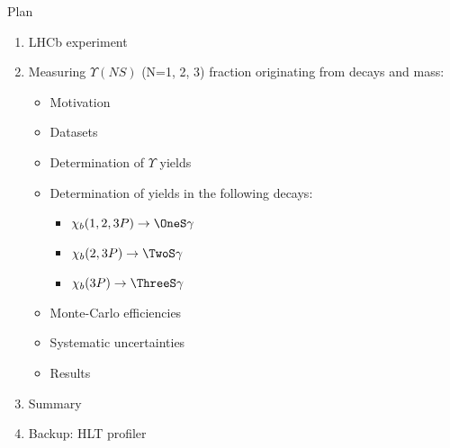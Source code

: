 \begin{frame}{Plan}
\begin{enumerate}
\item LHCb experiment
\item Measuring $\Upsilon(NS)$ (N=1, 2, 3) fraction  originating from \chib decays and \chibThreeP mass:
\begin{itemize}
\item Motivation
\item Datasets
\item Determination of $\Upsilon$ yields
\item Determination of \chib yields in the following decays:
\begin{itemize}
    \item $\chi_b(1,2,3P) \to \OneS \gamma$
    \item $\chi_b(2,3P) \to \TwoS \gamma$
    \item $\chi_b(3P) \to \ThreeS \gamma$
\end{itemize}
\item Monte-Carlo efficiencies
\item Systematic uncertainties 
\item Results
\end{itemize}
\item Summary
\item Backup: HLT profiler

\end{enumerate}
\end{frame}
